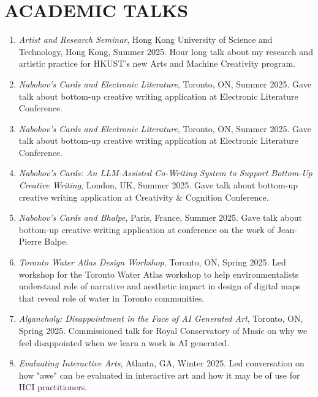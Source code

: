  \section{ACADEMIC TALKS}
 
 \begin{enumerate}
 
    \item \emph{Artist and Research Seminar}, Hong Kong University of Science and Technology, Hong Kong, Summer 2025. \subitem Hour long talk about my research and artistic practice for HKUST's new Arts and Machine Creativity program. 
 
   \item \emph{Nabokov's Cards and Electronic Literature}, Toronto, ON, Summer 2025. \subitem Gave talk about bottom-up creative writing application at Electronic Literature Conference. 
 
  \item \emph{Nabokov's Cards and Electronic Literature}, Toronto, ON, Summer 2025. \subitem Gave talk about bottom-up creative writing application at Electronic Literature Conference. 

   \item \emph{Nabokov's Cards: An LLM-Assisted Co-Writing System to Support Bottom-Up
Creative Writing}, London, UK, Summer 2025. \subitem Gave talk about bottom-up creative writing application at Creativity \& Cognition Conference. 
   
   \item \emph{Nabokov's Cards and Bhalpe}, Paris, France, Summer 2025. \subitem Gave talk about bottom-up creative writing application at conference on the work of Jean-Pierre Balpe. 
 
  \item \emph{Toronto Water Atlas Design Workshop}, Toronto, ON, Spring 2025. \subitem Led workshop for the Toronto Water Atlas workshop to help environmentalists understand role of narrative and aesthetic impact in design of digital maps that reveal role of water in Toronto communities. 
 
 \item \emph{Algancholy: Disappointment in the Face of AI Generated Art}, Toronto, ON, Spring 2025. \subitem Commissioned talk for Royal Conservatory of Music on why we feel disappointed when we learn a work is AI generated. 
 
  \item  \emph{Evaluating Interactive Arts}, Atlanta, GA, Winter 2025. \subitem Led conversation on how "awe" can be evaluated in interactive art and how it may be of use for HCI practitioners.
  

\end{enumerate}
